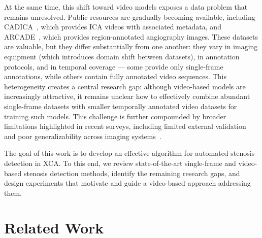 \documentclass{article}
\begin{document}
At the same time, this shift toward video models exposes a data problem that remains unresolved. Public resources are gradually becoming available, including CADICA~\cite{jimenezpartinen2024cadica}, which provides ICA videos with associated metadata, and ARCADE~\cite{popov2024arcade}, which provides region-annotated angiography images. These datasets are valuable, but they differ substantially from one another: they vary in imaging equipment (which introduces domain shift between datasets), in annotation protocols, and in temporal coverage — some provide only single-frame annotations, while others contain fully annotated video sequences. This heterogeneity creates a central research gap: although video-based models are increasingly attractive, it remains unclear how to effectively combine abundant single-frame datasets with smaller temporally annotated video datasets for training such models. This challenge is further compounded by broader limitations highlighted in recent surveys, including limited external validation and poor generalizability across imaging systems~\cite{popov2022reviewmodernapproachescoronary, cardiovascular}.

The goal of this work is to develop an effective algorithm for automated stenosis detection in XCA. To this end, we review state-of-the-art single-frame and video-based stenosis detection methods, identify the remaining research gaps, and design experiments that motivate and guide a video-based approach addressing them.

\section{Related Work}
\end{document}
